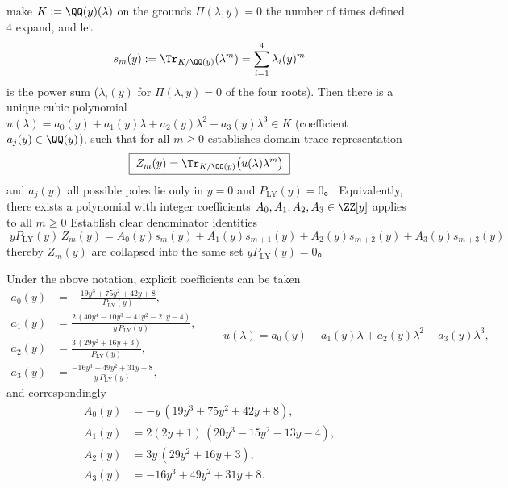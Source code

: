 \begin{conclusion}[Representation of domain traces and clear denominator integer identities: analytical obstacles are compressed into \(yP_{\mathrm{LY}}(y)=0\)]\label{con:xi-terminal-zm-field-trace-denominator-compression}
make \(K:=\QQ(y)(\lambda)\) on the grounds \(\Pi(\lambda,y)=0\) the number of times defined \(4\) expand, and let
\[
s_m(y):=\Tr_{K/\QQ(y)}(\lambda^{m})=\sum_{i=1}^{4}\lambda_i(y)^{m}
\]
is the power sum (\(\lambda_i(y)\) for \(\Pi(\lambda,y)=0\) of the four roots).
Then there is a unique cubic polynomial
\(
u(\lambda)=a_0(y)+a_1(y)\lambda+a_2(y)\lambda^{2}+a_3(y)\lambda^{3}\in K
\)
(coefficient \(a_j(y)\in\QQ(y)\)), such that for all \(m\ge 0\) establishes domain trace representation
\[
\boxed{\;
Z_m(y)=\Tr_{K/\QQ(y)}\bigl(u(\lambda)\lambda^{m}\bigr)\;}
\]
and \(a_j(y)\) all possible poles lie only in \(y=0\) and \(P_{\mathrm{LY}}(y)=0\)。
Equivalently, there exists a polynomial with integer coefficients \(A_0,A_1,A_2,A_3\in\ZZ[y]\) applies to all \(m\ge 0\) Establish clear denominator identities
\[
\boxed{\;
yP_{\mathrm{LY}}(y)\,Z_m(y)
=A_0(y)s_m(y)+A_1(y)s_{m+1}(y)+A_2(y)s_{m+2}(y)+A_3(y)s_{m+3}(y)\;}
\]
thereby \(Z_m(y)\) are collapsed into the same set \(yP_{\mathrm{LY}}(y)=0\)。
\par
Under the above notation, explicit coefficients can be taken
\[
\begin{aligned}
a_0(y)&=-\frac{19y^{3}+75y^{2}+42y+8}{P_{\mathrm{LY}}(y)},\\
a_1(y)&=\frac{2\,(40y^{4}-10y^{3}-41y^{2}-21y-4)}{y\,P_{\mathrm{LY}}(y)},\\
a_2(y)&=\frac{3\,(29y^{2}+16y+3)}{P_{\mathrm{LY}}(y)},\\
a_3(y)&=\frac{-16y^{3}+49y^{2}+31y+8}{y\,P_{\mathrm{LY}}(y)},
\end{aligned}
\qquad
u(\lambda)=a_0(y)+a_1(y)\lambda+a_2(y)\lambda^{2}+a_3(y)\lambda^{3},
\]
and correspondingly
\[
\begin{aligned}
A_0(y)&=-y\,(19y^{3}+75y^{2}+42y+8),\\
A_1(y)&=2(2y+1)\,(20y^{3}-15y^{2}-13y-4),\\
A_2(y)&=3y\,(29y^{2}+16y+3),\\
A_3(y)&=-16y^{3}+49y^{2}+31y+8.
\end{aligned}
\]
\end{conclusion}
